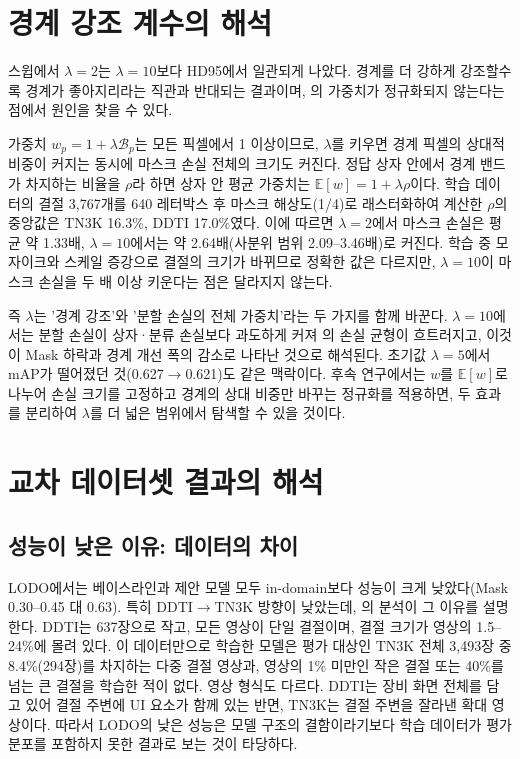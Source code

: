 \section{경계 강조 계수의 해석}\label{sec:disc_lambda}

스윕에서 $\lambda=2$는 $\lambda=10$보다 HD95에서 일관되게 나았다. 경계를 더 강하게 강조할수록 경계가 좋아지리라는 직관과
반대되는 결과이며, 의 가중치가 정규화되지 않는다는 점에서 원인을 찾을 수 있다.

가중치 $w_p = 1 + \lambda\mathcal{B}_p$는 모든 픽셀에서 1 이상이므로, $\lambda$를 키우면 경계 픽셀의 상대적 비중이 커지는 동시에
마스크 손실 전체의 크기도 커진다. 정답 상자 안에서 경계 밴드가 차지하는 비율을 $\rho$라 하면 상자 안 평균 가중치는
$\mathbb{E}[w] = 1 + \lambda\rho$이다. 학습 데이터의 결절 3,767개를 640 레터박스 후 마스크 해상도(1/4)로 래스터화하여 계산한
$\rho$의 중앙값은 TN3K 16.3\%, DDTI 17.0\%였다. 이에 따르면 $\lambda=2$에서 마스크 손실은 평균 약 1.33배, $\lambda=10$에서는
약 2.64배(사분위 범위 2.09--3.46배)로 커진다. 학습 중 모자이크와 스케일 증강으로 결절의 크기가 바뀌므로 정확한 값은 다르지만,
$\lambda=10$이 마스크 손실을 두 배 이상 키운다는 점은 달라지지 않는다.

즉 $\lambda$는 '경계 강조'와 '분할 손실의 전체 가중치'라는 두 가지를 함께 바꾼다. $\lambda=10$에서는 분할 손실이 상자·분류
손실보다 과도하게 커져 의 손실 균형이 흐트러지고, 이것이 Mask \mAP{} 하락과 경계 개선 폭의 감소로
나타난 것으로 해석된다. 초기값 $\lambda=5$에서 mAP가 떨어졌던 것(0.627$\rightarrow$0.621)도 같은 맥락이다.
후속 연구에서는 $w$를 $\mathbb{E}[w]$로 나누어 손실 크기를 고정하고 경계의 상대 비중만 바꾸는 정규화를 적용하면,
두 효과를 분리하여 $\lambda$를 더 넓은 범위에서 탐색할 수 있을 것이다.

\section{교차 데이터셋 결과의 해석}\label{sec:disc_lodo}

\subsection{성능이 낮은 이유: 데이터의 차이}

LODO에서는 베이스라인과 제안 모델 모두 in-domain보다 성능이 크게 낮았다(Mask \mAP{} 0.30--0.45 대 0.63). 특히
DDTI$\rightarrow$TN3K 방향이 낮았는데, 의 분석이 그 이유를 설명한다. DDTI는 637장으로 작고,
모든 영상이 단일 결절이며, 결절 크기가 영상의 1.5--24\%에 몰려 있다. 이 데이터만으로 학습한 모델은 평가 대상인 TN3K 전체 3,493장 중
8.4\%(294장)를 차지하는 다중 결절 영상과, 영상의 1\% 미만인 작은 결절 또는 40\%를 넘는 큰 결절을 학습한 적이 없다.
영상 형식도 다르다. DDTI는 장비 화면 전체를 담고 있어 결절 주변에 UI 요소가 함께 있는 반면, TN3K는 결절 주변을
잘라낸 확대 영상이다. 따라서 LODO의 낮은 성능은 모델 구조의 결함이라기보다 학습 데이터가 평가 분포를 포함하지
못한 결과로 보는 것이 타당하다.

